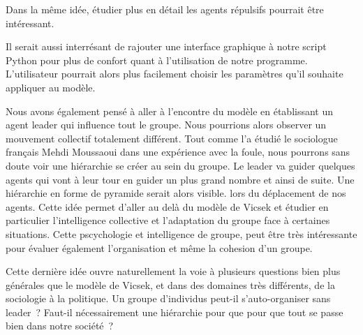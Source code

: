 \documentclass[french, a4paper, 12pt]{article}
\begin{document}
	Dans la même idée, étudier plus en détail les agents répulsifs pourrait être intéressant.
	
	Il serait aussi interrésant de rajouter une interface graphique à notre script Python pour plus de confort quant à l'utilisation de notre programme. L'utilisateur pourrait alors plus facilement choisir les paramètres qu'il souhaite appliquer au modèle.
	
	Nous avons également pensé à aller à l'encontre du modèle en établissant un agent leader qui influence tout le groupe. Nous pourrions alors observer un mouvement collectif totalement différent. Tout comme l'a étudié le sociologue français Mehdi Moussaoui dans une expérience avec la foule, nous pourrons sans doute voir une hiérarchie se créer au sein du groupe. Le leader va guider quelques agents qui vont à leur tour en guider un plus grand nombre et ainsi de suite. Une hiérarchie en forme de pyramide serait alors visible. lors du déplacement de nos agents. Cette idée permet d'aller au delà du modèle de Vicsek et étudier en particulier l'intelligence collective et l'adaptation du groupe face à certaines situations. Cette pscychologie et intelligence de groupe, peut être très intéressante pour évaluer également l'organisation et même la cohesion d'un groupe.
	
	Cette dernière idée ouvre naturellement la voie à plusieurs questions bien plus générales que le modèle de Vicsek, et dans des domaines très différents, de la sociologie à la politique. Un groupe d'individus peut-il s'auto-organiser sans leader~? Faut-il nécessairement une hiérarchie pour que pour que tout se passe bien dans notre société~?   
       



   
\end{document}
